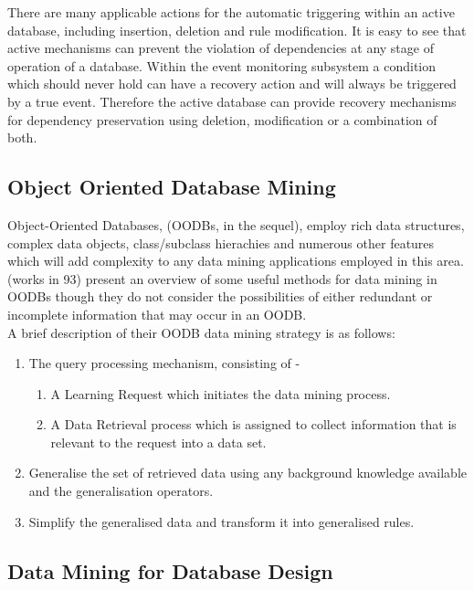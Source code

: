 There are many applicable actions for the automatic triggering within an 
active database, including insertion, deletion and rule modification.  It is easy
to see that active mechanisms can prevent the violation of dependencies at
any stage of operation of a database.  Within the event monitoring subsystem
a condition which should never hold can have a recovery action and will always
be triggered by a true event.  Therefore the active database can provide 
recovery mechanisms for dependency preservation using deletion, modification
or a combination of both.  


\subsection{Object Oriented Database Mining}

Object-Oriented Databases, (OODBs, in the sequel), employ rich data structures, 
complex data objects, class/subclass hierachies and numerous other features
which will add complexity to any data mining applications employed in this 
area.\\

(works in 93) present an overview of some useful methods for data mining in
OODBs though they do not consider the possibilities of either redundant or
incomplete information that may occur in an OODB.\\

A brief description of their OODB data mining strategy is as follows:
\begin{enumerate}
\item The query processing mechanism, consisting of -
\begin{enumerate}
\item A Learning Request which initiates the data mining process.
\item A Data Retrieval process which is assigned to collect information that is 
relevant
 to the request into a data set.
\end{enumerate}

\item Generalise the set of retrieved data using any background knowledge available 
and the generalisation operators.
\item Simplify the generalised data and transform it into generalised rules.

\end{enumerate}


\subsection{Data Mining for Database Design}

